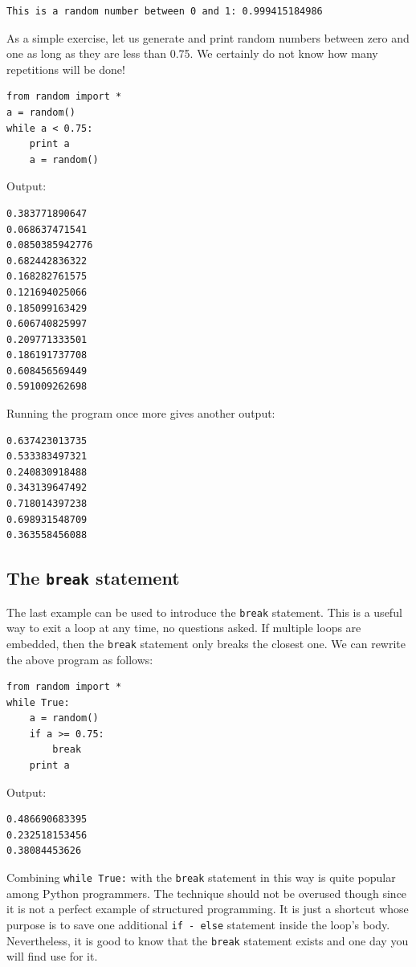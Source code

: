 \begin{verbatim}
This is a random number between 0 and 1: 0.999415184986
\end{verbatim}
As a simple exercise, let us generate and print random numbers between 
zero and one as long as they are less than 0.75. We certainly do not know 
how many repetitions will be done!

\begin{verbatim}
from random import *
a = random()
while a < 0.75:
    print a
    a = random()
\end{verbatim}
Output:

\begin{verbatim}
0.383771890647
0.068637471541
0.0850385942776
0.682442836322
0.168282761575
0.121694025066
0.185099163429
0.606740825997
0.209771333501
0.186191737708
0.608456569449
0.591009262698
\end{verbatim}
Running the program once more gives another output:

\begin{verbatim}
0.637423013735
0.533383497321
0.240830918488
0.343139647492
0.718014397238
0.698931548709
0.363558456088
\end{verbatim}

\subsection{The {\tt break} statement}

The last example can be used to 
introduce the {\tt break} statement. This is a useful way to exit a loop at any time,
no questions asked.
If multiple loops are embedded, then the {\tt break} statement only breaks the closest 
one. We can rewrite the above program as follows: 

\begin{verbatim}
from random import *
while True:
    a = random()
    if a >= 0.75: 
        break
    print a
\end{verbatim}
Output:

\begin{verbatim}
0.486690683395
0.232518153456
0.38084453626
\end{verbatim}
Combining {\tt while True:} with the {\tt break} statement in this way is 
quite popular among Python programmers. The technique should not be overused 
though since it is not a perfect example of structured programming. It is 
just a shortcut whose purpose is to save one additional {\tt if - else} statement
inside the loop's body. Nevertheless, it is good to know that the 
{\tt break} statement exists and one day you will find use for it.

